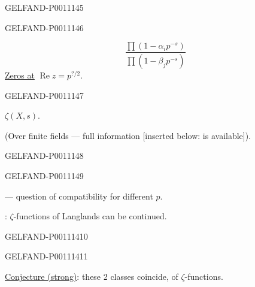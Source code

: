 \begin{GelfandAdjacentEvidence}{GELFAND-P001114}{5}

\end{GelfandAdjacentEvidence}
\begin{GelfandAdjacentEvidence}{GELFAND-P001114}{6}

\[
\frac{\prod(1-\alpha_i p^{-s})}{\prod(1-\beta_j p^{-s})}
\]
\underline{Zeros at} $\operatorname{Re}z=p^{?/2}$.
\end{GelfandAdjacentEvidence}
\begin{GelfandAdjacentEvidence}{GELFAND-P001114}{7}


 $\zeta(X,s)$.

(Over finite fields — full information [inserted below: is available]).
\end{GelfandAdjacentEvidence}
\begin{GelfandAdjacentEvidence}{GELFAND-P001114}{8}


\end{GelfandAdjacentEvidence}
\begin{GelfandAdjacentEvidence}{GELFAND-P001114}{9}

— question of compatibility for different $p$.

: $\zeta$-functions of Langlands can be continued.

\end{GelfandAdjacentEvidence}
\begin{GelfandAdjacentEvidence}{GELFAND-P001114}{10}

\end{GelfandAdjacentEvidence}
\begin{GelfandAdjacentEvidence}{GELFAND-P001114}{11}

\underline{Conjecture (strong)}: these 2 classes coincide, of $\zeta$-functions.

\end{GelfandAdjacentEvidence}
